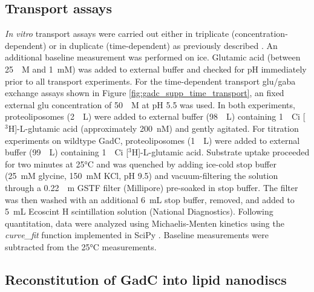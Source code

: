 \subsection{Transport assays}\label{sec:gadc_transport_assay}

\emph{In vitro} transport assays were carried out either in triplicate (concentration-dependent) or in duplicate (time-dependent) as previously described \citep*{Ma2012}. An additional baseline measurement was performed on ice. Glutamic acid (between \SI{25}{\upmu M} and \SI{1}{mM}) was added to external buffer and checked for pH immediately prior to all transport experiments. For the time-dependent transport \gls{glu}/\gls{gaba} exchange assays shown in Figure \ref{fig:gadc_supp_time_transport}, an fixed external \gls{glu} concentration of \SI{50}{\upmu M} at pH 5.5 was used. In both experiments, proteoliposomes (\SI{2}{\upmu L}) were added to external buffer (\SI{98}{\upmu L}) containing \SI{1}{\upmu Ci} [$\mathrm{^3H}$]-L-glutamic acid (approximately \SI{200}{nM}) and gently agitated. For titration experiments on wildtype GadC, proteoliposomes (\SI{1}{\upmu L}) were added to external buffer (\SI{99}{\upmu L}) containing \SI{1}{\upmu Ci} [$\mathrm{^3H}$]-L-glutamic acid. Substrate uptake proceeded for two minutes at 25°C and was quenched by adding ice-cold stop buffer (\SI{25}{mM} glycine, \SI{150}{mM} KCl, pH 9.5) and vacuum-filtering the solution through a \SI{0.22}{\upmu m} GSTF filter (Millipore) pre-soaked in stop buffer. The filter was then washed with an additional \SI{6}{mL} stop buffer, removed, and added to \SI{5}{mL} Ecoscint H scintillation solution (National Diagnostics). Following quantitation, data were analyzed using Michaelis-Menten kinetics using the \emph{curve\_fit} function implemented in SciPy \citep*{Virtanen2020}. Baseline measurements were subtracted from the 25°C measurements.

\subsection{Reconstitution of GadC into lipid nanodiscs}


